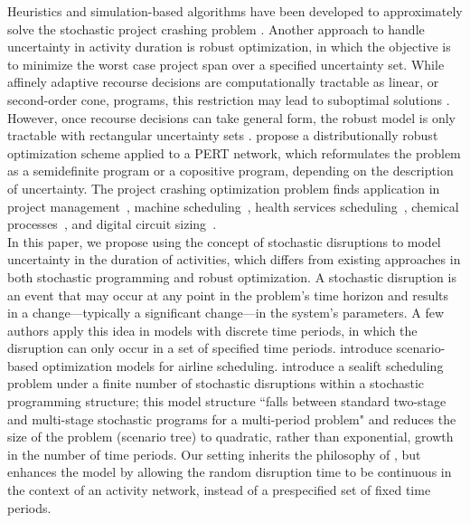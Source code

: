 \documentclass[11pt]{article}
\begin{document}
	Heuristics and simulation-based algorithms have been developed to approximately solve the stochastic project crashing problem \citep{aghaie2009ant, bowman1994stochastic, ke2014genetic, kim2007heuristic}. Another approach to handle uncertainty in activity duration is robust optimization, in which the objective is to minimize the worst case project span over a specified uncertainty set. While affinely adaptive recourse decisions are computationally tractable as linear, or second-order cone, programs, this restriction may lead to suboptimal solutions \citep{chen2008linear, cohen2007stochastic}. However, once recourse decisions can take general form, the robust model is only tractable with rectangular uncertainty sets
	\citep{wiesemann2012robust}. \citet{ahipasaoglu2016distributionally} propose a distributionally robust optimization scheme applied to a PERT network, which reformulates the problem as a semidefinite program or a copositive program, depending on the description of uncertainty. The project crashing optimization problem finds application in project management~\citep{demeulemeester2006project, jaselskis1991allocation,tonchia2018industrial}, machine scheduling~\citep{blazewicz1983scheduling,hall1996machine}, health services scheduling~\citep{cardoen2010operating}, chemical processes~\citep{li2008process}, and digital circuit sizing~\citep{kim2007heuristic}.\\
	\newline
	In this paper, we propose using the concept of stochastic disruptions to model uncertainty in the duration of activities, which differs from existing approaches in both stochastic programming and robust optimization. A stochastic disruption is an event that may occur at any point in the problem's time horizon and results in a change---typically a significant change---in the system's parameters. A few authors apply this idea in models with discrete time periods, in which the disruption can only occur in a set of specified time periods. \citet{yu2004disruptionmgt} introduce scenario-based optimization models for airline scheduling. \citet{morton2009sealift} introduce a sealift scheduling problem under a finite number of stochastic disruptions within a stochastic programming structure; this model structure ``falls between standard two-stage and multi-stage stochastic programs for a multi-period problem" and reduces the size of the problem (scenario tree) to quadratic, rather than exponential, growth in the number of time periods. Our setting inherits the philosophy of \citet{morton2009sealift}, but enhances the model by allowing the random disruption time to be continuous in the context of an activity network, instead of a prespecified set of fixed time periods. \\
\end{document}
